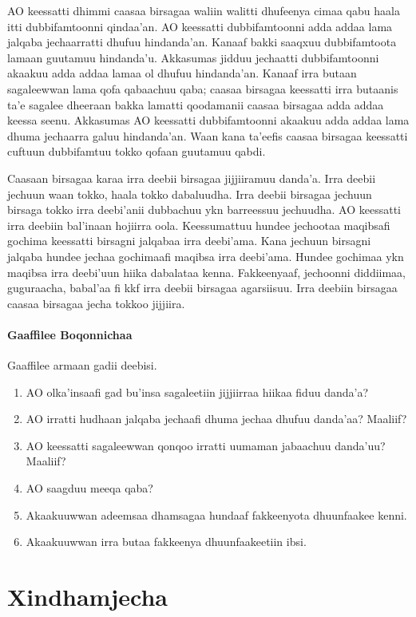 \documentclass[11pt,b5paper]{book}
\begin{document}
\begin{itemize}
AO keessatti dhimmi caasaa birsagaa waliin walitti dhufeenya  cimaa qabu haala itti dubbifamtoonni qindaa’an. AO keessatti  dubbifamtoonni adda addaa lama jalqaba jechaarratti dhufuu  hindanda’an. Kanaaf bakki saaqxuu dubbifamtoota lamaan  guutamuu hindanda’u. Akkasumas jidduu jechaatti  dubbifamtoonni akaakuu adda addaa lamaa ol dhufuu  hindanda’an. Kanaaf irra butaan sagaleewwan lama qofa  qabaachuu qaba; caasaa birsagaa keessatti irra butaanis ta’e  sagalee dheeraan bakka lamatti qoodamanii caasaa birsagaa  adda addaa keessa seenu. Akkasumas AO keessatti  dubbifamtoonni akaakuu adda addaa lama dhuma jechaarra  galuu hindanda’an. Waan kana ta’eefis caasaa birsagaa  keessatti cuftuun dubbifamtuu tokko qofaan guutamuu qabdi.

Caasaan birsagaa karaa irra deebii birsagaa jijjiiramuu danda'a. Irra deebii jechuun waan tokko, haala tokko dabaluudha. Irra  deebii birsagaa jechuun birsaga tokko irra deebi’anii  dubbachuu ykn barreessuu jechuudha. AO keessatti irra  deebiin bal’inaan hojiirra oola. Keessumattuu hundee jechootaa maqibsafi gochima keessatti birsagni jalqabaa irra deebi’ama.  Kana jechuun birsagni jalqaba hundee jechaa gochimaafi  maqibsa irra deebi’ama. Hundee gochimaa ykn maqibsa irra  deebi’uun hiika dabalataa kenna. Fakkeenyaaf, jechoonni diddiimaa, guguraacha, babal'aa fi kkf irra deebii birsagaa agarsiisuu. Irra deebiin birsagaa caasaa birsagaa jecha tokkoo jijjiira. 

\subsubsection{Gaaffilee Boqonnichaa}

Gaaffilee armaan gadii deebisi.
\begin{enumerate}
  \item AO olka'insaafi gad bu'insa sagaleetiin jijjiirraa hiikaa fiduu danda'a?
  \item AO irratti hudhaan jalqaba jechaafi dhuma jechaa dhufuu danda'aa? Maaliif?
  \item AO keessatti sagaleewwan qonqoo irratti uumaman jabaachuu danda'uu? Maaliif?
  \item AO saagduu meeqa qaba? 
  \item Akaakuuwwan adeemsaa dhamsagaa hundaaf fakkeenyota dhuunfaakee kenni.
  \item Akaakuuwwan irra butaa fakkeenya dhuunfaakeetiin ibsi.
\end{enumerate}

\chapter{Xindhamjecha}


\end{itemize}
\end{document}
